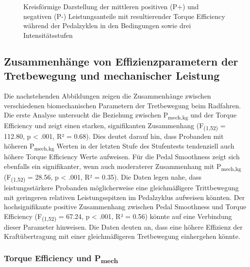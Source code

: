 \documentclass[
  letterpaper,
  DIV=11]{scrartcl}
\begin{document}
\begin{figure}


\caption{\label{fig-Eff_KD_Bedingung_Intensität}Kreisförmige Darstellung
der mittleren positiven (P+) und negativen (P-) Leistungsanteile mit
resultierender Torque Efficiency während der Pedalzyklen in den
Bedingungen sowie drei Intensitätsstufen}

\end{figure}%

\subsection{Zusammenhänge von Effizienzparametern der Tretbewegung und
mechanischer
Leistung}\label{zusammenhuxe4nge-von-effizienzparametern-der-tretbewegung-und-mechanischer-leistung}

Die nachstehenden Abbildungen zeigen die Zusammenhänge zwischen
verschiedenen biomechanischen Parametern der Tretbewegung beim
Radfahren. Die erste Analyse untersucht die Beziehung zwischen
P\textsubscript{mech,kg} und der Torque Efficiency und zeigt einen
starken, signifikanten Zusammenhang (F\textsubscript{(1,52)} = 112.80, p
\textless{} .001, R² = 0.68). Dies deutet darauf hin, dass Probanden mit
höheren P\textsubscript{mech,kg} Werten in der letzten Stufe des
Stufentests tendenziell auch höhere Torque Efficiency Werte aufweisen.
Für die Pedal Smoothness zeigt sich ebenfalls ein signifikanter, wenn
auch moderaterer Zusammenhang mit P\textsubscript{mech,kg}
(F\textsubscript{(1,52)} = 28.56, p \textless{} .001, R² = 0.35). Die
Daten legen nahe, dass leistungsstärkere Probanden möglicherweise eine
gleichmäßigere Trittbewegung mit geringeren relativen Leistungsspitzen
im Pedalzyklus aufweisen könnten. Der hochsignifikante positive
Zusammenhang zwischen Pedal Smoothness und Torque Efficiency
(F\textsubscript{(1,52)} = 67.24, p \textless{} .001, R² = 0.56) könnte
auf eine Verbindung dieser Parameter hinweisen. Die Daten deuten an,
dass eine höhere Effizienz der Kraftübertragung mit einer
gleichmäßigeren Tretbewegung einhergehen könnte.

\subsubsection{\texorpdfstring{Torque Efficiency und
P\textsubscript{mech}}{Torque Efficiency und Pmech}}
\end{document}
